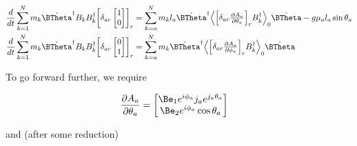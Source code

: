 \begin{align}\label{eqn:multiPendulumSpherical2:boo7}
\frac{d}{dt}
\sum_{k=1}^N m_k
\dot{\BTheta}^\dagger
B_k B_k^\dagger
{\begin{bmatrix}
\delta_{ar}
\begin{bmatrix}
1 \\
0
\end{bmatrix}
\end{bmatrix}}_r
&=
\sum_{k=a}^N m_k l_a
\dot{\BTheta}^\dagger
\gpgradezero{
{\begin{bmatrix}
\delta_{ar}
\PD{\theta_a}{A_a} \\
\end{bmatrix}}_r
B_k^\dagger }
\dot{\BTheta}
-g \mu_a l_a \sin\theta_a \\
\frac{d}{dt}
\sum_{k=1}^N m_k
\dot{\BTheta}^\dagger
B_k B_k^\dagger
{\begin{bmatrix}
\delta_{ar}
\begin{bmatrix}
0 \\
1
\end{bmatrix}
\end{bmatrix}}_r
&=
\sum_{k=a}^N m_k
\dot{\BTheta}^\dagger
\gpgradezero{
{\begin{bmatrix}
\delta_{ar}
\PD{\phi_a}{A_a} \\
\end{bmatrix}}_r
B_k^\dagger }
\dot{\BTheta}
\end{align}

To go forward further, we require

\begin{align}\label{eqn:multiPendulumSpherical2:boo10}
\PD{\theta_a}{A_a} &=
\begin{bmatrix}
\Be_1 e^{i \phi_a} j_a e^{j_a \theta_a} \\
\Be_2 e^{i \phi_a} \cos\theta_a
\end{bmatrix}
\end{align}

and (after some reduction)

